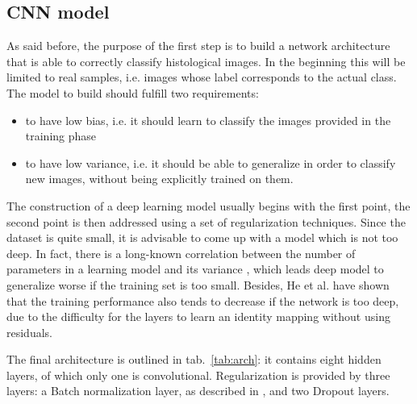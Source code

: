 \documentclass[11pt,twoside,a4paper]{article}
\begin{document}
\subsection{CNN model}
\label{sec:naive_model}
As said before, the purpose of the first step is to build a network architecture that is able to correctly classify histological images. In the beginning this will be limited to real samples, i.e. images whose label corresponds to the actual class.\newline
The model to build should fulfill two requirements:
\begin{itemize}
\item to have low bias, i.e. it should learn to classify the images provided in the training phase
\item to have low variance, i.e. it should be able to generalize in order to classify new images, without being explicitly trained on them.
\end{itemize}

The construction of a deep learning model usually begins with the first point, the second point is then addressed using a set of regularization techniques. Since the dataset is quite small, it is advisable to come up with a model which is not too deep. In fact, there is a long-known correlation between the number of parameters in a learning model and its variance \cite{james2013introduction}, which leads deep model to generalize worse if the training set is too small. Besides, He et al. \cite{he2016deep} have shown that the training performance also tends to decrease if the network is too deep, due to the difficulty for the layers to learn an identity mapping without using residuals.

The final architecture is outlined in tab.~\ref{tab:arch}: it contains eight hidden layers, of which only one is convolutional. Regularization is provided by three layers: a Batch normalization layer, as described in \cite{ioffe2015batch}, and two Dropout layers.
\end{document}
